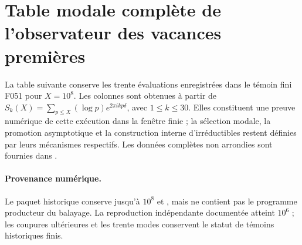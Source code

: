 \section{Table modale complète de l’observateur des vacances premières}
\label{v:f051:appendix:modal-table}

La table suivante conserve les trente évaluations enregistrées dans le témoin
fini F051 pour \(X=10^8\). Les colonnes sont obtenues à partir de
\(S_k(X)=\sum_{p\leq X}(\log p)e^{2\pi i k p\delta}\), avec
\(1\leq k\leq30\). Elles constituent une preuve numérique de cette exécution dans
la fenêtre finie ; la sélection modale, la promotion asymptotique et la construction
interne d’irréductibles restent définies par leurs mécanismes respectifs. Les
données complètes non arrondies sont fournies dans
.

\paragraph{Provenance numérique.}
Le paquet historique conserve  jusqu’à \(10^8\)
et , mais ne contient pas le programme producteur
du balayage. La reproduction indépendante documentée atteint
\(10^6\) ; les coupures ultérieures et les trente modes conservent le statut
de témoins historiques finis.

